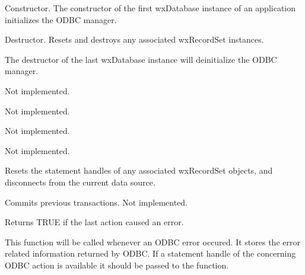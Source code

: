 

Constructor. The constructor of the first wxDatabase instance of an
application initializes the ODBC manager.



Destructor. Resets and destroys any associated wxRecordSet instances.

The destructor of the last wxDatabase instance will deinitialize
the ODBC manager.



Not implemented.



Not implemented.


  
Not implemented.




Not implemented.



Resets the statement handles of any associated wxRecordSet objects,
and disconnects from the current data source.



Commits previous transactions. Not implemented.



Returns TRUE if the last action caused an error.



This function will be called whenever an ODBC error occured. It stores the
error related information returned by ODBC. If a statement handle of the
concerning ODBC action is available it should be passed to the function.

